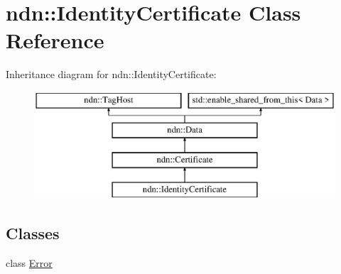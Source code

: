 \hypertarget{classndn_1_1IdentityCertificate}{}\section{ndn\+:\+:Identity\+Certificate Class Reference}
\label{classndn_1_1IdentityCertificate}
Inheritance diagram for ndn\+:\+:Identity\+Certificate\+:\begin{figure}[H]
\begin{center}
\leavevmode
\includegraphics[height=4.000000cm]{classndn_1_1IdentityCertificate}
\end{center}
\end{figure}
\subsection*{Classes}
\begin{DoxyCompactItemize}
\item 
class \hyperlink{classndn_1_1IdentityCertificate_1_1Error}{Error}
\end{DoxyCompactItemize}
